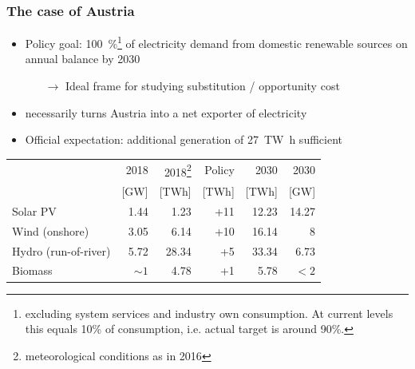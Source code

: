 \documentclass[aspectratio=1610, xcolor=dvipsnames,handout]{beamer} %
\begin{document}
    \begin{frame}
        \frametitle{The case of Austria}
        \begin{itemize}
            \item Policy goal: \SI{100}{\percent}\footnote[frame]{excluding system services and industry own consumption.
            At current levels this equals 10\% of consumption, i.e. actual target is around 90\%.} of electricity demand from
            domestic renewable sources on annual balance by 2030
            \begin{itemize}
                \item[$\rightarrow$] Ideal frame for studying substitution / opportunity cost
            \end{itemize}
            \item necessarily turns Austria into a net exporter of electricity
            \item Official expectation: additional generation of \SI{27}{\tera\watt\hour} sufficient
        \end{itemize}
        \begin{table}
            \centering
            \begin{tabular}{lrrrrr}
                & 2018 & 2018\footnote[frame]{meteorological conditions as in 2016} & Policy & 2030 & 2030 \\
                & [GW] & [TWh] & [TWh] & [TWh] & [GW] \\ \hline \hline
                Solar PV & 1.44 & 1.23 & +11 & 12.23 & 14.27 \\ \hline
                Wind (onshore) & 3.05 & 6.14 & +10 & 16.14 & 8 \\ \hline
                Hydro (run-of-river) & 5.72 & 28.34 & +5 & 33.34 & 6.73 \\ \hline
                Biomass & $\sim 1$ & 4.78 & +1 & 5.78 & $<2$ %
            \end{tabular}
        \end{table}
    \end{frame}
\end{document}
